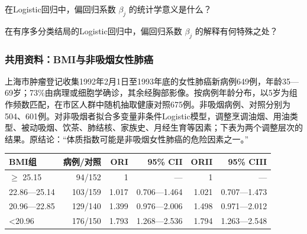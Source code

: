 \par\addvspace{8pt}\noindent\begin{minipage}{\linewidth}


在Logistic回归中，偏回归系数 \(\beta_j\) 的统计学意义是什么？



\end{minipage}\par\vspace{5pt}

\par\addvspace{8pt}\noindent\begin{minipage}{\linewidth}


在有序多分类结局的Logistic回归中，偏回归系数 \(\beta_j\) 的解释有何特殊之处？



\end{minipage}\par\vspace{5pt}

\subsubsection*{共用资料：BMI与非吸烟女性肺癌}

上海市肿瘤登记收集1992年2月1日至1993年底的女性肺癌新病例649例，年龄35---69岁；73\%由病理或细胞学确诊，其余经胸部影像。按病例年龄分布，以5岁为组作频数匹配，在市区人群中随机抽取健康对照675例。非吸烟病例、对照分别为504、601例。对非吸烟者拟合多变量非条件Logistic模型，调整烹调油烟、用油类型、被动吸烟、饮茶、肺结核、家族史、月经生育等因素；下表为两个调整层次的结果。原结论：``体质指数可能是非吸烟女性肺癌的危险因素之一。''

\begin{center}\small\setlength{\tabcolsep}{3.5pt}\renewcommand{\arraystretch}{1.18}\begin{tabular}{@{}lrrrrr@{}}
\toprule
BMI组 & 病例/对照 & ORI & 95\% CII & ORII & 95\% CIII \\
\midrule

\(\ge\) 25.15 & 94/152 & 1 & --- & 1 & --- \\
22.86---25.14 & 103/159 & 1.017 & 0.706---1.464 & 1.021 & 0.707---1.473 \\
20.96---22.85 & 129/140 & 1.399 & 0.976---2.006 & 1.498 & 0.971---2.012 \\
\textless20.96 & 176/150 & 1.793 & 1.268---2.536 & 1.794 & 1.263---2.548 \\
\bottomrule\end{tabular}\end{center}

